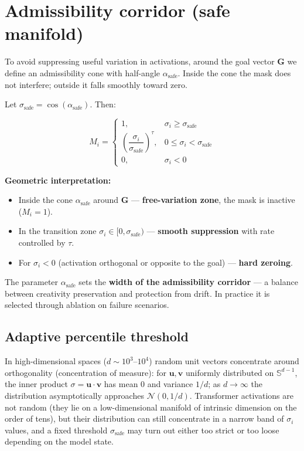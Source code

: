 \documentclass[12pt,a4paper]{article}
\begin{document}
\section{Admissibility corridor (safe manifold)}

To avoid suppressing useful variation in activations, around the goal vector $\mathbf{G}$ we define an admissibility cone with half-angle $\alpha_{\text{safe}}$. Inside the cone the mask does not interfere; outside it falls smoothly toward zero.

Let $\sigma_{\text{safe}} = \cos(\alpha_{\text{safe}})$. Then:

\begin{equation}
M_i = \begin{cases}
1, & \sigma_i \geq \sigma_{\text{safe}} \\[2mm]
\left(\dfrac{\sigma_i}{\sigma_{\text{safe}}}\right)^{\tau}, & 0 \leq \sigma_i < \sigma_{\text{safe}} \\[3mm]
0, & \sigma_i < 0
\end{cases}
\end{equation}

\textbf{Geometric interpretation:}

\begin{itemize}
    \item Inside the cone $\alpha_{\text{safe}}$ around $\mathbf{G}$ --- \textbf{free-variation zone}, the mask is inactive ($M_i = 1$).
    \item In the transition zone $\sigma_i \in [0, \sigma_{\text{safe}})$ --- \textbf{smooth suppression} with rate controlled by $\tau$.
    \item For $\sigma_i < 0$ (activation orthogonal or opposite to the goal) --- \textbf{hard zeroing}.
\end{itemize}

The parameter $\alpha_{\text{safe}}$ sets the \textbf{width of the admissibility corridor} --- a balance between creativity preservation and protection from drift. In practice it is selected through ablation on failure scenarios.

\subsection{Adaptive percentile threshold}

In high-dimensional spaces ($d \sim 10^3$--$10^4$) random unit vectors concentrate around orthogonality (concentration of measure): for $\mathbf{u}, \mathbf{v}$ uniformly distributed on $\mathbb{S}^{d-1}$, the inner product $\sigma = \mathbf{u} \cdot \mathbf{v}$ has mean 0 and variance $1/d$; as $d \to \infty$ the distribution asymptotically approaches $\mathcal{N}(0, 1/d)$. Transformer activations are not random (they lie on a low-dimensional manifold of intrinsic dimension on the order of tens), but their distribution can still concentrate in a narrow band of $\sigma_i$ values, and a fixed threshold $\sigma_{\text{safe}}$ may turn out either too strict or too loose depending on the model state.
\end{document}
